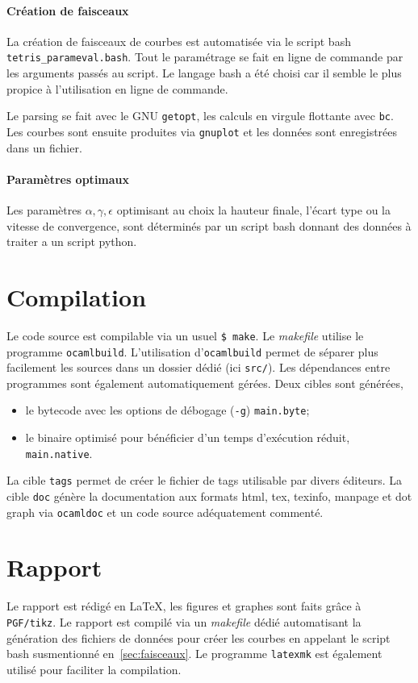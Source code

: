 \documentclass{report}
\begin{document}
\paragraph{Création de faisceaux}
La création de faisceaux de courbes est automatisée via le script bash
\texttt{tetris\_parameval.bash}. Tout le paramétrage se fait en ligne de commande
par les arguments passés au script. Le langage bash a été choisi car il semble
le plus propice à l'utilisation en ligne de commande.

Le parsing se fait avec le GNU \texttt{getopt}, les calculs en virgule flottante
avec \texttt{bc}. Les courbes sont ensuite produites via \texttt{gnuplot} et
les données sont enregistrées dans un fichier.

\paragraph{Paramètres optimaux}
Les paramètres \(\alpha, \gamma, \epsilon\) optimisant au choix la hauteur
finale, l'écart type ou la vitesse de convergence, sont déterminés par un script
bash donnant des données à traiter a un script python.



\section{Compilation}
Le code source est compilable via un usuel \texttt{\$ make}. Le
\textit{makefile} utilise le programme \texttt{ocamlbuild}. L'utilisation
d'\texttt{ocamlbuild} permet de séparer plus facilement les sources dans un
dossier dédié (ici \texttt{src/}). Les dépendances entre programmes sont
également automatiquement gérées. Deux cibles sont générées,
\begin{itemize}
  \item le bytecode avec les options de débogage (\texttt{-g})
    \texttt{main.byte};
  \item le binaire optimisé pour bénéficier d'un temps d'exécution réduit,
    \texttt{main.native}.
\end{itemize}

La cible
\texttt{tags} permet de créer le fichier de tags utilisable par divers éditeurs.
La cible \texttt{doc} génère la documentation aux formats html, tex, texinfo,
manpage et dot graph via \texttt{ocamldoc} et un code source adéquatement
commenté.




\section{Rapport}
Le rapport est rédigé en \LaTeX{}, les figures et graphes sont faits grâce à
\texttt{PGF/tikz}. Le rapport est compilé via un \textit{makefile} dédié
automatisant la génération des fichiers de données pour créer les courbes en
appelant le script bash susmentionné en~\ref{sec:faisceaux}. Le
programme \texttt{latexmk} est également utilisé pour faciliter la compilation.
\end{document}
